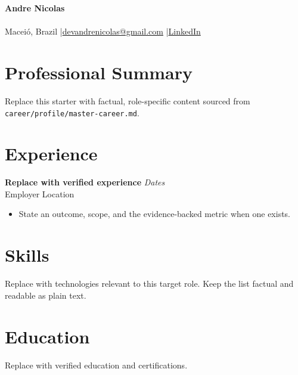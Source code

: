 
\begin{center}
  {\LARGE \textbf{Andre Nicolas}}\\[0.25em]
  \TargetRole\\[0.35em]
  Maceió, Brazil \enspace|\enspace \href{mailto:devandrenicolas@gmail.com}{devandrenicolas@gmail.com} \enspace|\enspace \href{https://www.linkedin.com/in/devandrenicolas}{LinkedIn}
\end{center}

\section*{Professional Summary}
Replace this starter with factual, role-specific content sourced from \texttt{career/profile/master-career.md}.

\section*{Experience}
\textbf{Replace with verified experience} \hfill \textit{Dates}\\
Employer \textbar{} Location
\begin{itemize}
  \item State an outcome, scope, and the evidence-backed metric when one exists.
\end{itemize}

\section*{Skills}
Replace with technologies relevant to this target role. Keep the list factual and readable as plain text.

\section*{Education}
Replace with verified education and certifications.

